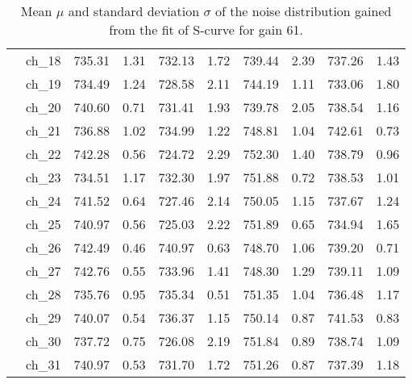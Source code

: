 \begin{table}[H]
{\begin{tabular}{|c|c|c|c|c|c|c|c|c|c|}
  &ch\_18 & 735.31 & 1.31 & 732.13 & 1.72 & 739.44 & 2.39 & 737.26 & 1.43 \\
  &ch\_19 & 734.49 & 1.24 & 728.58 & 2.11 & 744.19 & 1.11 & 733.06 & 1.80 \\
  &ch\_20 & 740.60 & 0.71 & 731.41 & 1.93 & 739.78 & 2.05 & 738.54 & 1.16 \\
  &ch\_21 & 736.88 & 1.02 & 734.99 & 1.22 & 748.81 & 1.04 & 742.61 & 0.73 \\
  &ch\_22 & 742.28 & 0.56 & 724.72 & 2.29 & 752.30 & 1.40 & 738.79 & 0.96 \\
  &ch\_23 & 734.51 & 1.17 & 732.30 & 1.97 & 751.88 & 0.72 & 738.53 & 1.01 \\
  &ch\_24 & 741.52 & 0.64 & 727.46 & 2.14 & 750.05 & 1.15 & 737.67 & 1.24 \\
  &ch\_25 & 740.97 & 0.56 & 725.03 & 2.22 & 751.89 & 0.65 & 734.94 & 1.65 \\
  &ch\_26 & 742.49 & 0.46 & 740.97 & 0.63 & 748.70 & 1.06 & 739.20 & 0.71 \\
  &ch\_27 & 742.76 & 0.55 & 733.96 & 1.41 & 748.30 & 1.29 & 739.11 & 1.09 \\
  &ch\_28 & 735.76 & 0.95 & 735.34 & 0.51 & 751.35 & 1.04 & 736.48 & 1.17 \\
  &ch\_29 & 740.07 & 0.54 & 736.37 & 1.15 & 750.14 & 0.87 & 741.53 & 0.83 \\
  &ch\_30 & 737.72 & 0.75 & 726.08 & 2.19 & 751.84 & 0.89 & 738.74 & 1.09 \\
  &ch\_31 & 740.97 & 0.53 & 731.70 & 1.72 & 751.26 & 0.87 & 737.39 & 1.18 \\
  
    
    \hline
     
    \end{tabular}
    }
    \caption{Mean $\mu$ and standard deviation $\sigma$ of the noise distribution gained from the fit of S-curve for gain 61.}
    \label{tab:noise_parameter_2}
\end{table}

